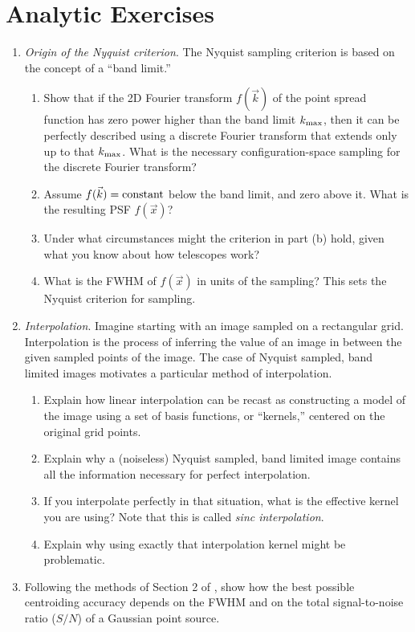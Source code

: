\section{Analytic Exercises}

\begin{enumerate}
\item {\it Origin of the Nyquist criterion}. The Nyquist
    sampling criterion is based on the concept of a ``band
    limit.''
    \begin{enumerate}
    \item Show that if the 2D Fourier
    transform $f(\vec{k})$ of the point spread function has zero power
    higher than the band limit $k_{\rm max}$, then it can be perfectly
    described using a discrete Fourier transform that extends only up
    to that $k_{\rm max}$. What is the necessary configuration-space
    sampling for the discrete Fourier transform?
    \item Assume $f(\vec{k}) = {\rm constant}$
    below the band limit, and zero above it. What is the resulting PSF
    $f(\vec{x})$?
    \item Under what circumstances might the criterion in part (b)
    hold, given what you know about how telescopes work?
    \item What is the FWHM of $f(\vec{x})$ in units of the sampling?
    This sets the Nyquist criterion for sampling.
    \end{enumerate}
\item {\it Interpolation}. Imagine starting with an image sampled on a
    rectangular grid. Interpolation is the process of inferring
    the value of an image in between the given sampled points of the
    image. The case of Nyquist sampled, band limited images motivates
    a particular method of interpolation.
    \begin{enumerate}
    \item Explain how linear interpolation can be recast as
    constructing a model of the image using a set of basis functions,
    or ``kernels,'' centered on the original grid points.
    \item Explain why a (noiseless) Nyquist sampled, band limited
    image contains all the information necessary for perfect
    interpolation.
    \item If you interpolate perfectly in that situation, what is the
    effective kernel you are using? Note that this is called {\it
    sinc interpolation}.
    \item Explain why using exactly that interpolation kernel might be
    problematic.
    \end{enumerate}
\item Following the methods of Section 2 of \citet{vakili16a}, show
    how the best possible centroiding accuracy depends on the FWHM and
    on the total signal-to-noise ratio ($S/N$) of a Gaussian point
    source.
\end{enumerate}

